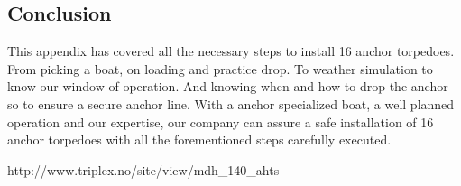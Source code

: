 \documentclass[DIV=calc, paper=a4, fontsize=13pt, twocolumn]{scrartcl}	 %
\begin{document}
\subsection*{Conclusion}
This appendix has covered all the necessary steps to install 16 anchor torpedoes. From picking a boat, on loading and practice drop. To weather simulation to know our window of operation. And knowing when and how to drop the anchor so to ensure a secure anchor line.
\newline 
With a anchor specialized boat, a well planned operation and our expertise,
our company can assure a safe installation of 16 anchor torpedoes with all the forementioned steps carefully executed. 










\newpage


\begin{thebibliography}{99} %


\newblock http://www.triplex.no/site/view/mdh\_140\_ahts
 
\end{thebibliography}




\end{document}
